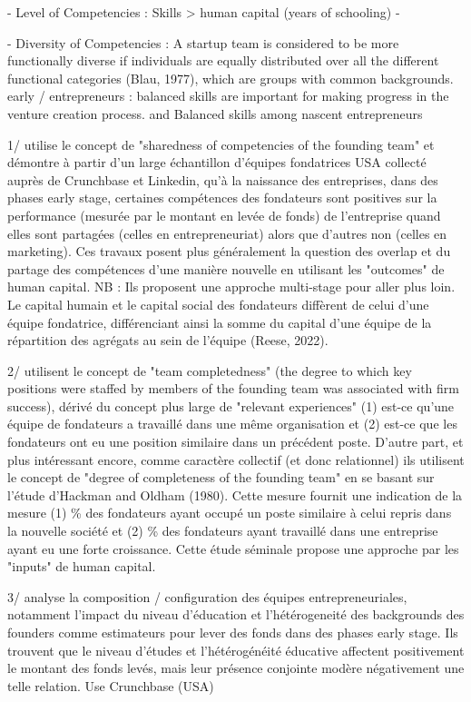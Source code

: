 \documentclass[12pt]{article}
\begin{document}
- Level of Competencies : Skills > human capital (years of schooling) - \citet{hanushek2016will}

- Diversity of Competencies : A startup team is considered to be more functionally diverse if individuals are equally distributed over all the different functional categories (Blau, 1977), which are groups with common backgrounds. early / entrepreneurs : balanced skills are important for making progress in the venture creation process. and Balanced skills among nascent entrepreneurs %

1/ \citet{reese2020should} utilise le concept de "sharedness of competencies of the founding team" et démontre à partir d'un large échantillon d'équipes fondatrices USA collecté auprès de Crunchbase et Linkedin, qu'à la naissance des entreprises, dans des phases early stage, certaines compétences des fondateurs sont positives sur la performance (mesurée par le montant en levée de fonds) de l’entreprise quand elles sont partagées (celles en entrepreneuriat) alors que d’autres non (celles en marketing). Ces travaux posent plus généralement la question des overlap et du partage des compétences d'une manière nouvelle en utilisant les "outcomes" de human capital. NB : Ils proposent une approche multi-stage pour aller plus loin. Le capital humain et le capital social des fondateurs diffèrent de celui d'une équipe fondatrice, différenciant ainsi la somme du capital d'une équipe de la répartition des agrégats au sein de l'équipe (Reese, 2022).

2/ \citep{roure1986linking, roure1990predictors} utilisent le concept de "team completedness" (the degree to which key positions were staffed by members of the founding team was associated with firm success), dérivé du concept plus large de "relevant experiences" (1) est-ce qu'une équipe de fondateurs a travaillé dans une même organisation et (2) est-ce que les fondateurs ont eu une position similaire dans un précédent poste. D'autre part, et plus intéressant encore, comme caractère collectif (et donc relationnel) ils utilisent le concept de "degree of completeness of the founding team" en se basant sur l'étude d'Hackman and Oldham (1980). Cette mesure fournit une indication de la mesure (1) \% des fondateurs ayant occupé un poste similaire à celui repris dans la nouvelle société et (2) \% des fondateurs ayant travaillé dans une entreprise ayant eu une forte croissance. Cette étude séminale propose une approche par les "inputs" de human capital.

3/ \citep{pinelli2020too} analyse la composition / configuration des équipes entrepreneuriales, notamment l'impact du niveau d'éducation et l'hétérogeneité des backgrounds des founders comme estimateurs pour lever des fonds dans des phases early stage. Ils trouvent que le niveau d'études et l'hétérogénéité éducative affectent positivement le montant des fonds levés, mais leur présence conjointe modère négativement une telle relation. Use Crunchbase (USA)
\end{document}
